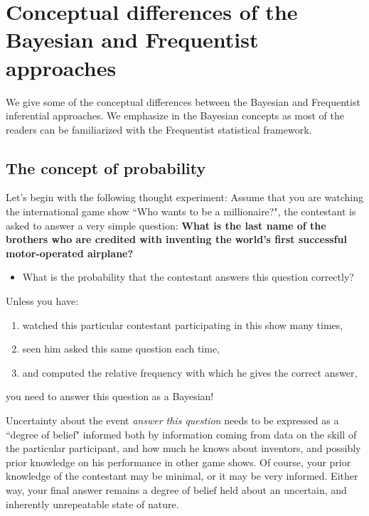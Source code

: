 \chapter{Conceptual differences of the Bayesian and Frequentist approaches}\label{chap2}

We give some of the conceptual differences between the Bayesian and Frequentist inferential approaches. We emphasize in the Bayesian concepts as most of the readers can be familiarized with the Frequentist statistical framework.

\section{The concept of probability}\label{sec21}

Let's begin with the following thought experiment: Assume that you are watching the international game show ``Who wants to be a millionaire?", the contestant is asked to answer a very simple question: \textbf{What is the last name of the brothers who are credited with inventing  the world's first successful motor-operated airplane?}

\begin{itemize}
	\item What is the probability that the contestant answers this question correctly? 
\end{itemize}

Unless you have: 

\begin{enumerate}
	\item  watched this particular contestant participating in this show many times,
	\item seen him asked this same question each time, 
	\item and computed the relative frequency with which he gives the correct answer,   
\end{enumerate}
 
you need to answer this question as a Bayesian!

Uncertainty about the event \textit{answer this question} needs to be expressed as a ``degree of belief" informed both by information coming from data on the skill of the particular participant, and how much he knows about inventors, and possibly prior knowledge on his performance in other game shows. Of course, your prior knowledge of the contestant may be minimal, or it may be very informed. Either way, your final answer remains a degree of belief held about an uncertain, and inherently unrepeatable state of nature.

